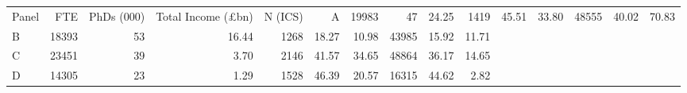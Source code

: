 \begin{tabular}{lrrrrrrrrr}
\toprule
Panel & FTE & PhDs (000) & Total Income (£bn) & N (ICS) & %
\midrule
A & 19983 & 47 & 24.25 & 1419 & 45.51 & 33.80 & 48555 & 40.02 & 70.83 \\
B & 18393 & 53 & 16.44 & 1268 & 18.27 & 10.98 & 43985 & 15.92 & 11.71 \\
C & 23451 & 39 & 3.70 & 2146 & 41.57 & 34.65 & 48864 & 36.17 & 14.65 \\
D & 14305 & 23 & 1.29 & 1528 & 46.39 & 20.57 & 16315 & 44.62 & 2.82 \\
\bottomrule
\end{tabular}
